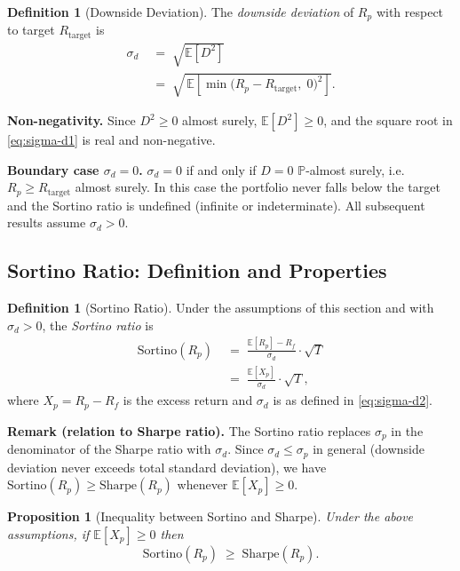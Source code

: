 \documentclass[12pt,openany]{book}
\newcommand{\E}{\mathbb{E}}
\numberwithin{equation}{chapter}
\theoremstyle{plain}
\newtheorem{proposition}[theorem]{Proposition}
\theoremstyle{definition}
\newtheorem{definition}[theorem]{Definition}
\theoremstyle{remark}
\numberwithin{equation}{chapter}
\theoremstyle{plain}
\begin{document}
\begin{definition}[Downside Deviation]
\label{def:downside-dev}
The \emph{downside deviation} of $R_p$ with respect to target
$R_{\mathrm{target}}$ is
\begin{align}
  \sigma_d
    &\;=\; \sqrt{\E\!\left[D^{2}\right]}
  \label{eq:sigma-d1} \\
    &\;=\; \sqrt{\,\E\!\left[\min\!\bigl(
               R_p - R_{\mathrm{target}},\;0
             \bigr)^{2}\right]}.
  \label{eq:sigma-d2}
\end{align}

\noindent
\textbf{Non-negativity.}
Since $D^{2} \geq 0$ almost surely,
$\E[D^{2}] \geq 0$, and the square root in
\eqref{eq:sigma-d1} is real and non-negative.

\noindent
\textbf{Boundary case $\sigma_d = 0$.}
$\sigma_d = 0$ if and only if $D = 0$ $\mathbb{P}$-almost
surely, i.e.\ $R_p \geq R_{\mathrm{target}}$ almost surely.
In this case the portfolio never falls below the target and
the Sortino ratio is undefined (infinite or indeterminate).
All subsequent results assume $\sigma_d > 0$.
\end{definition}

\subsection{Sortino Ratio: Definition and Properties}

\begin{definition}[Sortino Ratio]
\label{def:sortino}
Under the assumptions of this section and with $\sigma_d > 0$,
the \emph{Sortino ratio} is
\begin{align}
  \mathrm{Sortino}(R_p)
    &\;=\; \frac{\E[R_p] - R_f}{\sigma_d}
           \cdot \sqrt{T}
  \label{eq:sortino1} \\
    &\;=\; \frac{\E[X_p]}{\sigma_d}
           \cdot \sqrt{T},
  \label{eq:sortino}
\end{align}
where $X_p = R_p - R_f$ is the excess return and
$\sigma_d$ is as defined in \eqref{eq:sigma-d2}.
\end{definition}

\noindent
\textbf{Remark (relation to Sharpe ratio).}
The Sortino ratio replaces $\sigma_p$ in the denominator
of the Sharpe ratio with $\sigma_d$.  Since
$\sigma_d \leq \sigma_p$ in general (downside deviation
never exceeds total standard deviation), we have
$\mathrm{Sortino}(R_p) \geq \mathrm{Sharpe}(R_p)$
whenever $\E[X_p] \geq 0$.

\begin{proposition}[Inequality between Sortino and Sharpe]
\label{prop:sortino-sharpe-ineq}
Under the above assumptions, if $\E[X_p] \geq 0$ then
\begin{equation}
  \mathrm{Sortino}(R_p) \;\geq\; \mathrm{Sharpe}(R_p).
  \label{eq:sortino-geq-sharpe}
\end{equation}
\end{proposition}
\end{document}
